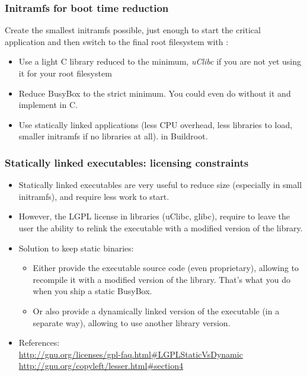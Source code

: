 \begin{frame}
\frametitle{Initramfs for boot time reduction}
Create the smallest initramfs possible, just enough to start the critical
application and then switch to the final root filesystem with
:
\begin{itemize}
\item Use a light C library reduced to the minimum,
      {\em uClibc} if you are not yet using it for your root filesystem
\item Reduce BusyBox to the strict minimum.
      You could even do without it and implement  in C.
\item Use statically linked applications (less CPU overhead, less
      libraries to load, smaller initramfs if no libraries at all).
       in Buildroot.
\end{itemize}
\end{frame}

\begin{frame}
\frametitle{Statically linked executables: licensing constraints}
\begin{itemize}
\item Statically linked executables are very useful to reduce size
      (especially in small initramfs), and require less work to start.
\item However, the LGPL license in libraries (uClibc, glibc), require
      to leave the user the ability to relink the executable
      with a modified version of the library.
\item Solution to keep static binaries:
      \begin{itemize}
      \item Either provide the executable source code (even
            proprietary), allowing to recompile it with a modified
            version of the library. That's what you do when
            you ship a static BusyBox.
      \item Or also provide a dynamically linked version of the
	    executable (in a separate way), allowing to use another
            library version.
      \end{itemize}
\item References: \\
      {\footnotesize
      \url{http://gnu.org/licenses/gpl-faq.html\#LGPLStaticVsDynamic} \\
      \url{http://gnu.org/copyleft/lesser.html\#section4}
      }
\end{itemize}
\end{frame}

